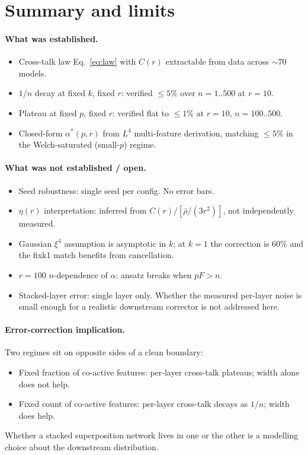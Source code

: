 \documentclass[11pt]{article}
\begin{document}
\section{Summary and limits}

\paragraph{What was established.}
\begin{itemize}
  \item Cross-talk law Eq.~\eqref{eq:law} with $C(r)$ extractable from
  data across $\sim 70$ models.
  \item $1/n$ decay at fixed $k$, fixed $r$: verified $\le 5\%$ over
  $n=1..500$ at $r{=}10$.
  \item Plateau at fixed $p$, fixed $r$: verified flat to $\le 1\%$
  at $r{=}10$, $n = 100..500$.
  \item Closed-form $\alpha^*(p, r)$ from $L^4$ multi-feature
  derivation, matching $\le 5\%$ in the Welch-saturated (small-$p$)
  regime.
\end{itemize}

\paragraph{What was not established / open.}
\begin{itemize}
  \item Seed robustness: single seed per config. No error bars.
  \item $\eta(r)$ interpretation: inferred from $C(r)/[\bar\rho/(3r^2)]$,
  not independently measured.
  \item Gaussian $\xi^4$ assumption is asymptotic in $k$; at $k{=}1$ the
  correction is $60\%$ and the fixk1 match benefits from cancellation.
  \item $r{=}100$ $n$-dependence of $\alpha$: ansatz breaks when $pF > n$.
  \item Stacked-layer error: single layer only. Whether the measured
  per-layer noise is small enough for a realistic downstream corrector
  is not addressed here.
\end{itemize}

\paragraph{Error-correction implication.} Two regimes sit on opposite sides
of a clean boundary:
\begin{itemize}
  \item Fixed fraction of co-active features: per-layer cross-talk
  plateaus; width alone does not help.
  \item Fixed count of co-active features: per-layer cross-talk decays
  as $1/n$; width does help.
\end{itemize}
Whether a stacked superposition network lives in one or the other is a
modelling choice about the downstream distribution.
\end{document}
